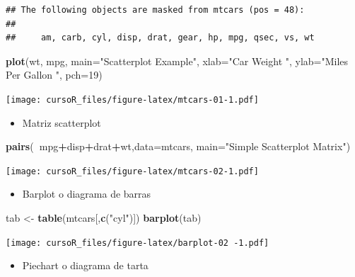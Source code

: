 \documentclass[]{book}
\newenvironment{Shaded}{\begin{snugshade}}{\end{snugshade}}
\newcommand{\KeywordTok}[1]{\textcolor[rgb]{0.13,0.29,0.53}{\textbf{#1}}}
\newcommand{\DataTypeTok}[1]{\textcolor[rgb]{0.13,0.29,0.53}{#1}}
\newcommand{\DecValTok}[1]{\textcolor[rgb]{0.00,0.00,0.81}{#1}}
\newcommand{\StringTok}[1]{\textcolor[rgb]{0.31,0.60,0.02}{#1}}
\newcommand{\OperatorTok}[1]{\textcolor[rgb]{0.81,0.36,0.00}{\textbf{#1}}}
\newcommand{\NormalTok}[1]{#1}
\providecommand{\tightlist}{%
  \setlength{\itemsep}{0pt}\setlength{\parskip}{0pt}}
\begin{document}
\begin{verbatim}
## The following objects are masked from mtcars (pos = 48):
## 
##     am, carb, cyl, disp, drat, gear, hp, mpg, qsec, vs, wt
\end{verbatim}

\begin{Shaded}
\begin{Highlighting}[]
\KeywordTok{plot}\NormalTok{(wt, mpg, }\DataTypeTok{main=}\StringTok{"Scatterplot Example"}\NormalTok{,}
   \DataTypeTok{xlab=}\StringTok{"Car Weight "}\NormalTok{, }\DataTypeTok{ylab=}\StringTok{"Miles Per Gallon "}\NormalTok{, }\DataTypeTok{pch=}\DecValTok{19}\NormalTok{) }
\end{Highlighting}
\end{Shaded}

\texttt{[image: cursoR\_files/figure-latex/mtcars-01-1.pdf]}

\begin{itemize}
\tightlist
\item
  Matriz scatterplot
\end{itemize}

\begin{Shaded}
\begin{Highlighting}[]
\KeywordTok{pairs}\NormalTok{(}\OperatorTok{~}\NormalTok{mpg}\OperatorTok{+}\NormalTok{disp}\OperatorTok{+}\NormalTok{drat}\OperatorTok{+}\NormalTok{wt,}\DataTypeTok{data=}\NormalTok{mtcars,}
   \DataTypeTok{main=}\StringTok{"Simple Scatterplot Matrix"}\NormalTok{)}
\end{Highlighting}
\end{Shaded}

\texttt{[image: cursoR\_files/figure-latex/mtcars-02-1.pdf]}

\begin{itemize}
\tightlist
\item
  Barplot o diagrama de barras
\end{itemize}

\begin{Shaded}
\begin{Highlighting}[]
\NormalTok{tab <-}\StringTok{ }\KeywordTok{table}\NormalTok{(mtcars[,}\KeywordTok{c}\NormalTok{(}\StringTok{"cyl"}\NormalTok{)])}
\KeywordTok{barplot}\NormalTok{(tab)}
\end{Highlighting}
\end{Shaded}

\texttt{[image: cursoR\_files/figure-latex/barplot-02 -1.pdf]}

\begin{itemize}
\tightlist
\item
  Piechart o diagrama de tarta
\end{itemize}
\end{document}

